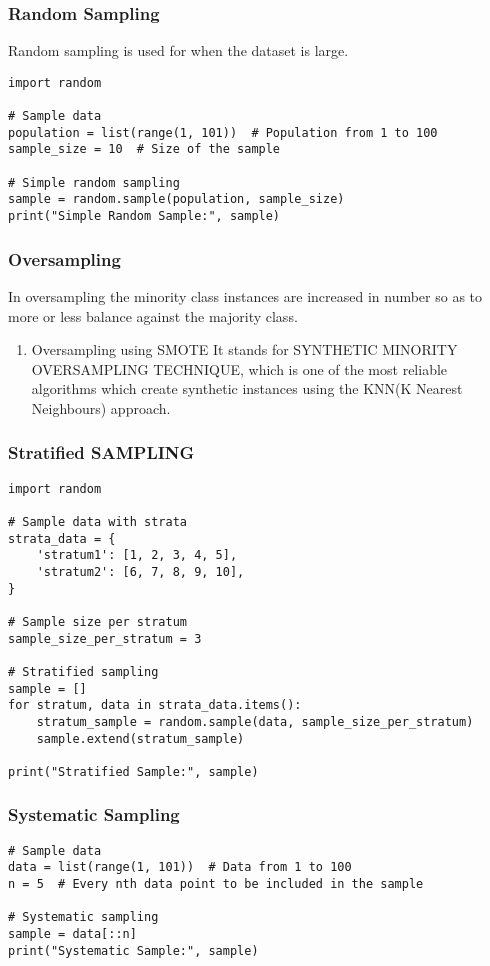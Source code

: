 \documentclass[11pt]{article}
\begin{document}
\subsubsection{Random Sampling}
\label{sec:orgbced240}
Random sampling is used for when the dataset is large.
\begin{verbatim}
import random

# Sample data
population = list(range(1, 101))  # Population from 1 to 100
sample_size = 10  # Size of the sample

# Simple random sampling
sample = random.sample(population, sample_size)
print("Simple Random Sample:", sample)
\end{verbatim}
\subsubsection{Oversampling}
\label{sec:orga0ed101}
In oversampling the minority class instances are increased in number so as to more or less balance against the majority class.
\begin{enumerate}
\item Oversampling using SMOTE
\label{sec:orgeeeb0d1}
It stands for SYNTHETIC MINORITY OVERSAMPLING TECHNIQUE, which is one of the most reliable algorithms which create synthetic instances using the KNN(K Nearest Neighbours) approach.
\end{enumerate}
\subsubsection{Stratified SAMPLING}
\label{sec:orgedb6e4c}
\begin{verbatim}
import random

# Sample data with strata
strata_data = {
    'stratum1': [1, 2, 3, 4, 5],
    'stratum2': [6, 7, 8, 9, 10],
}

# Sample size per stratum
sample_size_per_stratum = 3

# Stratified sampling
sample = []
for stratum, data in strata_data.items():
    stratum_sample = random.sample(data, sample_size_per_stratum)
    sample.extend(stratum_sample)

print("Stratified Sample:", sample)
\end{verbatim}
\subsubsection{Systematic Sampling}
\label{sec:orgbe143f4}
\begin{verbatim}
# Sample data
data = list(range(1, 101))  # Data from 1 to 100
n = 5  # Every nth data point to be included in the sample

# Systematic sampling
sample = data[::n]
print("Systematic Sample:", sample)
\end{verbatim}
\end{document}
